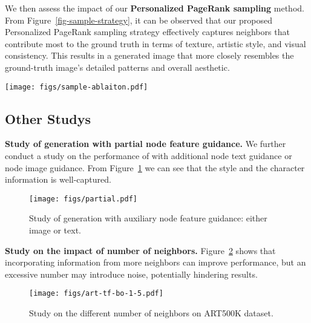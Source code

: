 \begin{table}
\centering
{}
\caption{The impact of using GNN or graph structure Q-former (GSQ) for structure information learning in \Ours on ART500K dataset.}
\label{table-ablation-GNN}
\end{table}

We then assess the impact of our \textbf{Personalized PageRank sampling} method. From Figure~\ref{fig-sample-strategy}, it can be observed that our proposed Personalized PageRank sampling strategy effectively captures neighbors that contribute most to the ground truth in terms of texture, artistic style, and visual consistency. This results in a generated image that more closely resembles the ground-truth image's detailed patterns and overall aesthetic.
\begin{figure*}
    \centering
    \texttt{[image: figs/sample-ablaiton.pdf]}
    \caption{The impact of sampling strategies. Our proposed personalized PageRank sampling strategy leads to better image-text pair.}
    \label{fig-sample-strategy}
\end{figure*}


\subsection{Other Studys}
\textbf{Study of generation with partial node feature guidance.} We further conduct a study on the performance of \Ours with additional node text guidance or node image guidance. From Figure~\ref{fig-partial-guidance} we can see that the style and the character information is well-captured.

\begin{figure}[h!]
    \centering
    \texttt{[image: figs/partial.pdf]}
    \caption{Study of \Ours generation with auxiliary node feature guidance: either image or text.}
    \label{fig-partial-guidance}
\end{figure}

\noindent
\textbf{Study on the impact of number of neighbors.} Figure~\ref{fig-neighbors-art} shows that incorporating information from more neighbors can improve performance, but an excessive number may introduce noise, potentially hindering results.
\begin{figure}[h!]
\centering
\texttt{[image: figs/art-tf-bo-1-5.pdf]}
    \caption{Study on the different number of neighbors on ART500K dataset.}
    \label{fig-neighbors-art}
\end{figure}